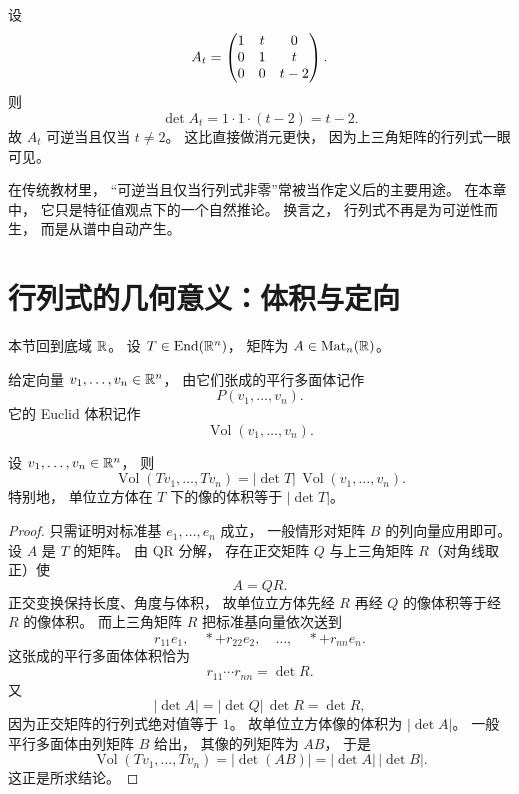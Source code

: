 \begin{example} 设 \[ A_t=\begin{pmatrix}  1&t&0\\ 0&1&t\\ 0&0&t-2 \end{pmatrix}. \] 则 \[ \det A_t=1\cdot1\cdot(t-2)=t-2. \] 故 \(A_t\) 可逆当且仅当 \(t\neq2\)。 这比直接做消元更快， 因为上三角矩阵的行列式一眼可见。 \end{example}




\begin{remark} 在传统教材里， “可逆当且仅当行列式非零”常被当作定义后的主要用途。 在本章中， 它只是特征值观点下的一个自然推论。 换言之， 行列式不再是为可逆性而生， 而是从谱中自动产生。 \end{remark}




\section{行列式的几何意义：体积与定向}\label{sec:det-geometry}




本节回到底域 \(\mathbb{R}\)。 设 \(T\in \mathrm{End}(\mathbb{R}^n)\)， 矩阵为 \(A\in \mathrm{Mat}_n(\mathbb{R})\)。




\begin{definition} 给定向量 \(v_1,\dots,v_n\in \mathbb{R}^n\)， 由它们张成的平行多面体记作 \[ P(v_1,\dots,v_n). \] 它的 Euclid 体积记作 \[ \operatorname{Vol}(v_1,\dots,v_n). \] \end{definition}




\begin{theorem}[体积缩放]\label{thm:volume-scaling} 设 \(v_1,\dots,v_n\in \mathbb{R}^n\)， 则 \[ \operatorname{Vol}(Tv_1,\dots,Tv_n) = |\det T|\,\operatorname{Vol}(v_1,\dots,v_n). \] 特别地， 单位立方体在 \(T\) 下的像的体积等于 \(|\det T|\)。 \end{theorem}




\begin{proof} 只需证明对标准基 \(e_1,\dots,e_n\) 成立， 一般情形对矩阵 \(B\) 的列向量应用即可。 设 \(A\) 是 \(T\) 的矩阵。 由 QR 分解， 存在正交矩阵 \(Q\) 与上三角矩阵 \(R\)（对角线取正）使 \[ A=QR. \] 正交变换保持长度、角度与体积， 故单位立方体先经 \(R\) 再经 \(Q\) 的像体积等于经 \(R\) 的像体积。 而上三角矩阵 \(R\) 把标准基向量依次送到 \[ r_{11}e_1,\quad *+r_{22}e_2,\quad \dots,\quad *+r_{nn}e_n. \] 这张成的平行多面体体积恰为 \[ r_{11}\cdots r_{nn}=\det R. \] 又 \[ |\det A|=|\det Q|\,\det R=\det R, \] 因为正交矩阵的行列式绝对值等于 \(1\)。 故单位立方体像的体积为 \(|\det A|\)。 一般平行多面体由列矩阵 \(B\) 给出， 其像的列矩阵为 \(AB\)， 于是 \[ \operatorname{Vol}(Tv_1,\dots,Tv_n) = |\det(AB)| = |\det A|\,|\det B|. \] 这正是所求结论。 \end{proof}




